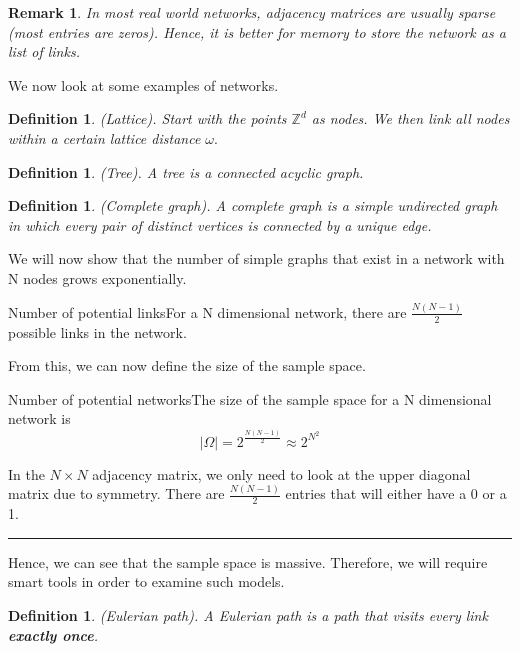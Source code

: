 \documentclass[twoside]{article}
\newtheorem{definition}[theorem]{Definition}
\newtheorem{remark}[theorem]{Remark}
\newenvironment{proof}{{\bf Proof:}}{\hfill\rule{2mm}{2mm}}
\begin{document}
\begin{remark}In most real world networks, adjacency matrices are usually sparse (most entries are zeros). Hence, it is better for memory to store the network as a list of links.
\end{remark}

We now look at some examples of networks.
\begin{definition}(Lattice). Start with the points $\mathbb{Z}^d$ as nodes. We then link all nodes within a certain lattice distance $\omega.$
\end{definition}

\begin{definition}(Tree). A tree is a connected acyclic graph.
\end{definition}

\begin{definition}(Complete graph). A complete graph is a simple undirected graph in which every pair of distinct vertices is connected by a unique edge.
\end{definition}

We will now show that the number of simple graphs that exist in a network with N nodes grows exponentially.

\begin{proposition_exam}{Number of potential links}{}For a N dimensional network, there are $\frac{N(N-1)}{2}$ possible links in the network.
\end{proposition_exam}

From this, we can now define the size of the sample space.

\begin{proposition_exam}{Number of potential networks}{}The size of the sample space for a N dimensional network is 
$$
|\Omega| = 2^{\frac{N(N-1)}{2}} \approx 2^{N^{2}}
$$
\end{proposition_exam}
\begin{proof} In the $N \times N$ adjacency matrix, we only need to look at the upper diagonal matrix due to symmetry. There are $\frac{N(N - 1)}{2}$ entries that will either have a 0 or a 1.
\end{proof}

Hence, we can see that the sample space is massive. Therefore, we will require smart tools in order to examine such models.

\begin{definition}(Eulerian path). A Eulerian path is a path that visits every link \textbf{exactly once}.
\end{definition}
\end{document}
